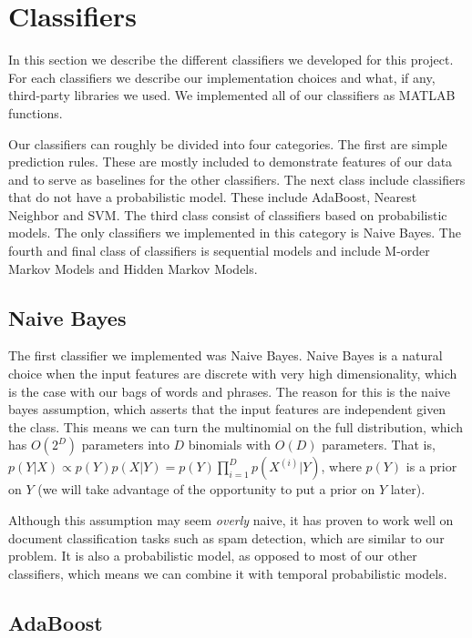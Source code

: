 \documentclass[10pt]{article}
\begin{document}
\section{Classifiers}
\label{sec:techniques}

In this section we describe the different classifiers we developed for this project.
For each classifiers we describe our implementation choices and what, if any, third-party libraries we used.
We implemented all of our classifiers as MATLAB functions.

Our classifiers can roughly be divided into four categories. The first are simple prediction rules. These are mostly included to demonstrate features of our data and to serve as baselines for the other classifiers. The next class include classifiers that do not have a probabilistic model. These include AdaBoost, Nearest Neighbor and SVM. The third class consist of classifiers based on probabilistic models. The only classifiers we implemented in this category is Naive Bayes. The fourth and final class of classifiers is sequential models and include M-order Markov Models and Hidden Markov Models.

\subsection{Naive Bayes}
\label{sec:naive-bayes}

The first classifier we implemented was Naive Bayes.
Naive Bayes is a natural choice when the input features are discrete with very high dimensionality, which is the case with our bags of words and phrases.
The reason for this is the naive bayes assumption, which asserts that the input features are independent given the class.
This means we can turn the multinomial on the full distribution, which has $O(2^D)$ parameters into $D$ binomials with $O(D)$ parameters.
That is, $p(Y|X) \propto p(Y)p(X|Y) = p(Y)\prod_{i=1}^{D}{p(X^{(i)}|Y)}$, where $p(Y)$ is a prior on $Y$ (we will take advantage of the opportunity to put a prior on $Y$ later).

Although this assumption may seem \emph{overly} naive, it has proven to work well on document classification tasks such as spam detection, which are similar to our problem.
It is also a probabilistic model, as opposed to most of our other classifiers, which means we can combine it with temporal probabilistic models.

\subsection{AdaBoost}
\label{sec:adaboost}
\end{document}

